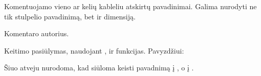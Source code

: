 \documentclass[letterpaper,10pt,lithuanian]{sphinxmanual}
\begin{document}
\begin{fulllineitems}
\label{\detokenize{dimensijos:comment.ref}}
\pysigstartsignatures
{}
\pysigstopsignatures
\sphinxAtStartPar
Komentuojamo vieno ar kelių kableliu atskirtų {\hyperref[\detokenize{formatas:property}]{}}
pavadinimai. Galima nurodyti ne tik stulpelio pavadinimą, bet ir
dimensiją.

\end{fulllineitems}


\begin{fulllineitems}
\label{\detokenize{dimensijos:comment.source}}
\pysigstartsignatures
{}
\pysigstopsignatures
\sphinxAtStartPar
Komentaro autorius.

\end{fulllineitems}


\begin{fulllineitems}
\label{\detokenize{dimensijos:comment.prepare}}
\pysigstartsignatures
{}
\pysigstopsignatures
\sphinxAtStartPar
Keitimo pasiūlymas, naudojant ,  ir  funkcijas. Pavyzdžiui:

\begin{sphinxVerbatim}[commandchars=\\\{\}]
   
\end{sphinxVerbatim}

\sphinxAtStartPar
Šiuo atveju nurodoma, kad siūloma keisti  pavadnimą į
, o  į .

\end{fulllineitems}
\end{document}
